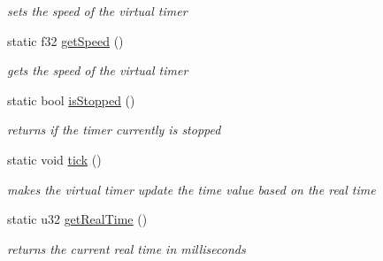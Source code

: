 \begin{DoxyCompactItemize}
\begin{DoxyCompactList}\small\item\em sets the speed of the virtual timer \end{DoxyCompactList}\item 
\hypertarget{classirr_1_1os_1_1_timer_aceb41ea1ae8146920a0a8b62332b4df7}{static f32 \hyperlink{classirr_1_1os_1_1_timer_aceb41ea1ae8146920a0a8b62332b4df7}{get\-Speed} ()}\label{classirr_1_1os_1_1_timer_aceb41ea1ae8146920a0a8b62332b4df7}

\begin{DoxyCompactList}\small\item\em gets the speed of the virtual timer \end{DoxyCompactList}\item 
\hypertarget{classirr_1_1os_1_1_timer_aad6c27db995b80c795038bb2f827dfc5}{static bool \hyperlink{classirr_1_1os_1_1_timer_aad6c27db995b80c795038bb2f827dfc5}{is\-Stopped} ()}\label{classirr_1_1os_1_1_timer_aad6c27db995b80c795038bb2f827dfc5}

\begin{DoxyCompactList}\small\item\em returns if the timer currently is stopped \end{DoxyCompactList}\item 
static void \hyperlink{classirr_1_1os_1_1_timer_a0473ceda20f46f2259020ee6e4c1aa04}{tick} ()
\begin{DoxyCompactList}\small\item\em makes the virtual timer update the time value based on the real time \end{DoxyCompactList}\item 
\hypertarget{classirr_1_1os_1_1_timer_aa0a73b26f4f18ac6fbc737caae2061cd}{static u32 \hyperlink{classirr_1_1os_1_1_timer_aa0a73b26f4f18ac6fbc737caae2061cd}{get\-Real\-Time} ()}\label{classirr_1_1os_1_1_timer_aa0a73b26f4f18ac6fbc737caae2061cd}

\begin{DoxyCompactList}\small\item\em returns the current real time in milliseconds \end{DoxyCompactList}\end{DoxyCompactItemize}


